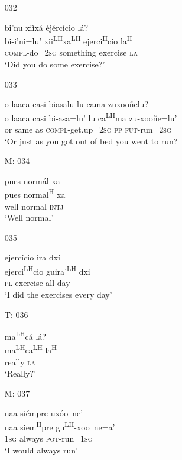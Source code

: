 \begin{itemize}
\item[032]
 
\glll   bi'nu xi\v{i}x\'{a} \'{e}j\'{e}rc\'{i}cio l\'{a}?\\
bi-i'ni=lu' xii\textsuperscript{LH}xa\textsuperscript{LH} ejerci\textsuperscript{H}cio la\textsuperscript{H}\\
\textsc{compl}-do=\textsc{2sg} something exercise \textsc{la}\\
\glt `Did you do some exercise?'
 
 

\item[033]
 
\glll   o laaca casi biasalu lu cama zuxoo\~{n}elu?\\
o laaca casi bi-asa=lu' lu ca\textsuperscript{LH}ma zu-xoo\~{n}e=lu'\\
or same as \textsc{compl}-get.up=\textsc{2sg} \textsc{pp} \textsc{fut}-run=\textsc{2sg}\\
\glt `Or just as you got out of bed you went to run?
 

\item[M: 034]
 

\glll   pues norm\'{a}l xa\\
pues normal\textsuperscript{H} xa\\
well normal \textsc{intj}\\
\glt `Well normal'
 

\item[035]
 
\glll  ejerc\'{i}cio ira dx\'{i}\\
  ejerci\textsuperscript{LH}cio guira'\textsuperscript{LH} dxi\\
 \textsc{pl} exercise all day\\
\glt `I did the exercises every day'
 


\item[T: 036]
  
\glll   ma\textsuperscript{LH}c\'{a} l\'{a}?\\
ma\textsuperscript{LH}ca\textsuperscript{LH} la\textsuperscript{H}\\
really \textsc{la}\\
\glt `Really?'
  

\item[M: 037]
 
\glll   naa si\'{e}mpre ux\'{o}o~{n}e'\\
naa siem\textsuperscript{H}pre gu\textsuperscript{LH}-xoo~{n}e=a'\\
\textsc{1sg} always \textsc{pot}-run=\textsc{1sg}\\
\glt `I would always run'
 


\end{itemize}

